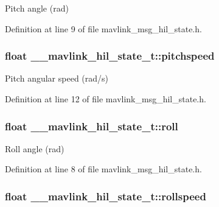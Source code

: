 Pitch angle (rad) 



Definition at line 9 of file mavlink\-\_\-msg\-\_\-hil\-\_\-state.\-h.

\hypertarget{struct____mavlink__hil__state__t_ad7d8b42ee6698e6f892c20146f954d5a}{
\subsubsection[{pitchspeed}]{\setlength{\rightskip}{0pt plus 5cm}float \-\_\-\-\_\-mavlink\-\_\-hil\-\_\-state\-\_\-t\-::pitchspeed}}\label{struct____mavlink__hil__state__t_ad7d8b42ee6698e6f892c20146f954d5a}


Pitch angular speed (rad/s) 



Definition at line 12 of file mavlink\-\_\-msg\-\_\-hil\-\_\-state.\-h.

\hypertarget{struct____mavlink__hil__state__t_a33202a922fda8d956b7ce78814d82558}{
\subsubsection[{roll}]{\setlength{\rightskip}{0pt plus 5cm}float \-\_\-\-\_\-mavlink\-\_\-hil\-\_\-state\-\_\-t\-::roll}}\label{struct____mavlink__hil__state__t_a33202a922fda8d956b7ce78814d82558}


Roll angle (rad) 



Definition at line 8 of file mavlink\-\_\-msg\-\_\-hil\-\_\-state.\-h.

\hypertarget{struct____mavlink__hil__state__t_a308aa515448a4d8d25131ce7c0f3254d}{
\subsubsection[{rollspeed}]{\setlength{\rightskip}{0pt plus 5cm}float \-\_\-\-\_\-mavlink\-\_\-hil\-\_\-state\-\_\-t\-::rollspeed}}\label{struct____mavlink__hil__state__t_a308aa515448a4d8d25131ce7c0f3254d}



